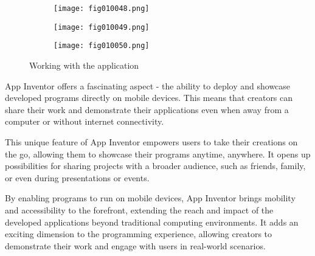 \begin{figure}[H]
   \begin{subfigure}{0.31\textwidth}
   \texttt{[image: fig010048.png]}
   \label{fig010048}
   \end{subfigure}
   \begin{subfigure}{0.31\textwidth}
   \texttt{[image: fig010049.png]}
   \label{fig010049}
   \end{subfigure}
   \begin{subfigure}{0.31\textwidth}
   \texttt{[image: fig010050.png]}
   \label{fig010050}
   \end{subfigure}
   \caption{Working with the application}
\end{figure}

App Inventor offers a fascinating aspect - the ability to deploy and showcase developed programs directly on mobile devices. This means that creators can share their work and demonstrate their applications even when away from a computer or without internet connectivity.

This unique feature of App Inventor empowers users to take their creations on the go, allowing them to showcase their programs anytime, anywhere. It opens up possibilities for sharing projects with a broader audience, such as friends, family, or even during presentations or events.

By enabling programs to run on mobile devices, App Inventor brings mobility and accessibility to the forefront, extending the reach and impact of the developed applications beyond traditional computing environments. It adds an exciting dimension to the programming experience, allowing creators to demonstrate their work and engage with users in real-world scenarios.
